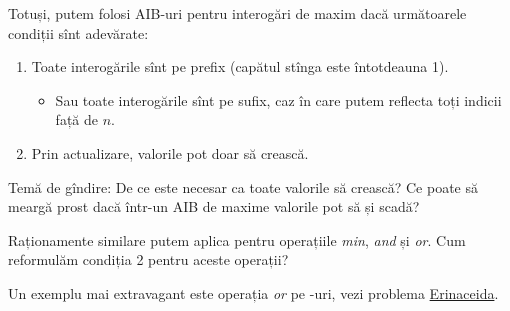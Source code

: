 \documentclass[../main.tex]{subfiles}
\begin{document}
Totuși, putem folosi AIB-uri pentru interogări de maxim dacă următoarele condiții sînt adevărate:

\begin{enumerate}
  \item Toate interogările sînt pe prefix (capătul stînga este întotdeauna 1).
  \begin{itemize}
    \item Sau toate interogările sînt pe sufix, caz în care putem reflecta toți indicii față de $n$.
  \end{itemize}
  \item Prin actualizare, valorile pot doar să crească.
\end{enumerate}

Temă de gîndire: De ce este necesar ca toate valorile să crească? Ce poate să meargă prost dacă într-un AIB de maxime valorile pot să și scadă?

Raționamente similare putem aplica pentru operațiile \textit{min}, \textit{and} și \textit{or}. Cum reformulăm condiția 2 pentru aceste operații?

Un exemplu mai extravagant este operația \textit{or} pe -uri, vezi problema \href{https://kilonova.ro/problems/210}{Erinaceida}.
\end{document}
